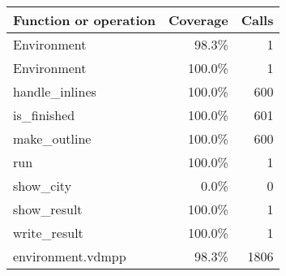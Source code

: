 \documentclass[a4paper]{article}
\begin{document}
\bigskip
\begin{longtable}{|l|r|r|}
\hline
Function or operation & Coverage & Calls \\
\hline
\hline
Environment & 98.3\% & 1 \\
\hline
Environment & 100.0\% & 1 \\
\hline
handle\_inlines & 100.0\% & 600 \\
\hline
is\_finished & 100.0\% & 601 \\
\hline
make\_outline & 100.0\% & 600 \\
\hline
run & 100.0\% & 1 \\
\hline
show\_city & 0.0\% & 0 \\
\hline
show\_result & 100.0\% & 1 \\
\hline
write\_result & 100.0\% & 1 \\
\hline
\hline
environment.vdmpp & 98.3\% & 1806 \\
\hline
\end{longtable}
\end{document}
